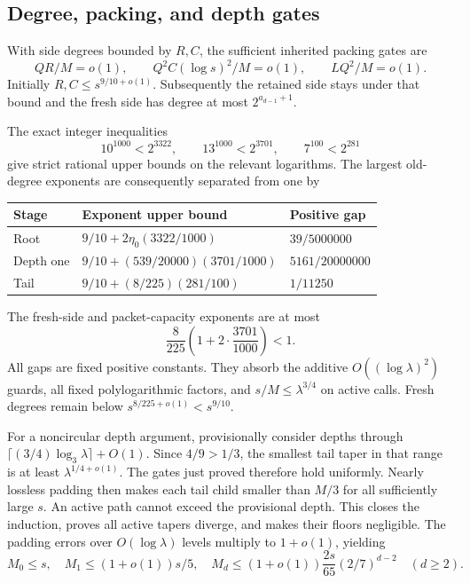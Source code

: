 \subsection{Degree, packing, and depth gates}

With side degrees bounded by $R,C$, the sufficient inherited packing gates
are
\begin{equation}\label{eq:packing-gates}
 QR/M=o(1),\qquad Q^2C(\log s)^2/M=o(1),\qquad LQ^2/M=o(1).
\end{equation}
Initially $R,C\le s^{9/10+o(1)}$. Subsequently the retained side stays
under that bound and the fresh side has degree at most $2^{a_{d-1}+1}$.

The exact integer inequalities
\[
 10^{1000}<2^{3322},\qquad 13^{1000}<2^{3701},\qquad 7^{100}<2^{281}
\]
give strict rational upper bounds on the relevant logarithms. The largest
old-degree exponents are consequently separated from one by
\begin{center}
\begin{tabular}{lll}
\toprule Stage & Exponent upper bound & Positive gap\\
\midrule
Root & $9/10+2\eta_0(3322/1000)$ & $39/5000000$\\
Depth one & $9/10+(539/20000)(3701/1000)$ & $5161/20000000$\\
Tail & $9/10+(8/225)(281/100)$ & $1/11250$\\
\bottomrule
\end{tabular}
\end{center}
The fresh-side and packet-capacity exponents are at most
\[
 \frac8{225}\left(1+2\cdot\frac{3701}{1000}\right)<1.
\]
All gaps are fixed positive constants. They absorb the additive
$O((\log\lambda)^2)$ guards, all fixed polylogarithmic factors, and
$s/M\le\lambda^{3/4}$ on active calls. Fresh degrees remain below
$s^{8/225+o(1)}<s^{9/10}$.

For a noncircular depth argument, provisionally consider depths through
$\lceil(3/4)\log_3\lambda\rceil+O(1)$. Since $4/9>1/3$, the smallest
tail taper in that range is at least $\lambda^{1/4+o(1)}$.
The gates just proved therefore hold uniformly. Nearly lossless padding
then makes each tail child smaller than $M/3$ for all sufficiently large
$s$. An active path cannot exceed the provisional depth. This closes the
induction, proves all active tapers diverge, and makes their floors
negligible. The padding errors over $O(\log\lambda)$ levels multiply to
$1+o(1)$, yielding
\begin{equation}\label{eq:masses}
 M_0\le s,\quad M_1\le(1+o(1))s/5,\quad
 M_d\le(1+o(1))\frac{2s}{65}(2/7)^{d-2}\quad(d\ge2).
\end{equation}


